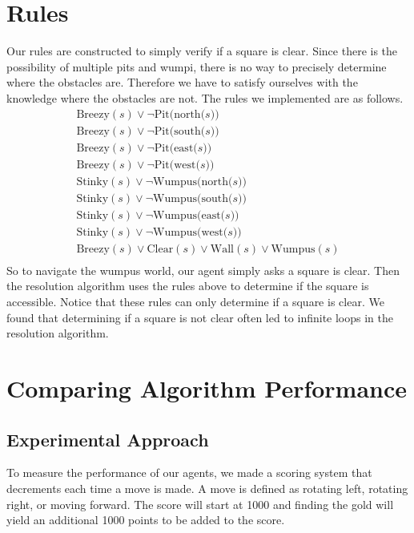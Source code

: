 \documentclass{article}
\begin{document}
\section{Rules}

Our rules are constructed to simply verify if a square is clear. Since there is the possibility of multiple pits and wumpi, there is no way to precisely determine where the obstacles are. Therefore we have to satisfy ourselves with the knowledge where the obstacles are not. The rules we implemented are as follows.
\begin{gather*}
\text{Breezy}(s) \lor \neg \text{Pit(north($s$))} \\
\text{Breezy}(s) \lor \neg \text{Pit(south($s$))} \\
\text{Breezy}(s) \lor \neg \text{Pit(east($s$))} \\
\text{Breezy}(s) \lor \neg \text{Pit(west($s$))} \\
\text{Stinky}(s) \lor \neg \text{Wumpus(north($s$))} \\
\text{Stinky}(s) \lor \neg \text{Wumpus(south($s$))} \\
\text{Stinky}(s) \lor \neg \text{Wumpus(east($s$))} \\
\text{Stinky}(s) \lor \neg \text{Wumpus(west($s$))} \\
\text{Breezy}(s) \lor \text{Clear}(s) \lor \text{Wall}(s) \lor \text{Wumpus}(s)\\
\end{gather*}
So to navigate the wumpus world, our agent simply asks a square is clear. 
Then the resolution algorithm uses the rules above to determine if the square is accessible. 
Notice that these rules can only determine if a square is clear. 
We found that determining if a square is not clear often led to infinite loops in the resolution algorithm.


\section{Comparing Algorithm Performance}
	\label{comparisons}
	
	\subsection{Experimental Approach}
	To measure the performance of our agents, we made a scoring system that decrements each time a move is made.
	 A move is defined as rotating left, rotating right, or moving forward.
	  The score will start at 1000 and finding the gold will yield an additional 1000 points to be added to the score.
	
\end{document}
